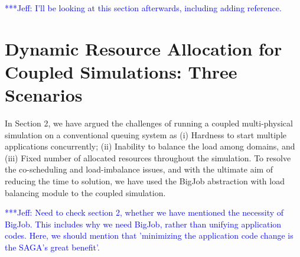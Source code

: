 \documentclass[conference,final]{IEEEtran}
\newcommand{\skonote}[1]{ {\textcolor{blue} { ***Jeff: #1 }}}
\newcommand{\skonote}[1]{}
\begin{document}
\skonote{I'll be looking at this section afterwards, including adding reference.}






\section{Dynamic Resource Allocation for Coupled Simulations: Three Scenarios }

In Section 2, we have argued the challenges of running a coupled
multi-physical simulation on a conventional queuing system as (i)
Hardness to start multiple applications concurrently; (ii) Inability
to balance the load among domains, and (iii) Fixed number of allocated
resources throughout the simulation. To resolve the co-scheduling and
load-imbalance issues, and with the ultimate aim of reducing the time
to solution, we have used the BigJob abstraction with load balancing
module to the coupled simulation.

\skonote{Need to check section 2, whether we have mentioned the necessity of BigJob. This includes why we need BigJob, rather than unifying application codes. Here, we should mention that 'minimizing the application code change is the SAGA's great benefit'.}
\end{document}
